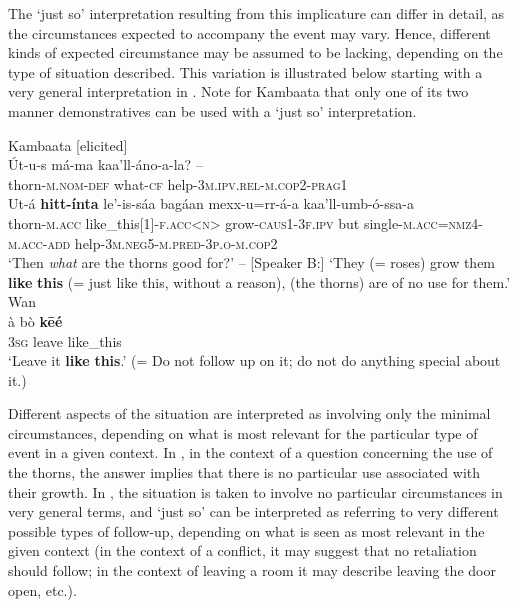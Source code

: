 \documentclass[output=paper,colorlinks,citecolor=brown]{langscibook}
\begin{document}
The ‘just so’ interpretation resulting from this implicature can differ in detail, as the circumstances expected to accompany the event may vary. Hence, different kinds of expected circumstance may be assumed to be lacking, depending on the type of situation described. This variation is illustrated below starting with a very general interpretation in . Note for Kambaata that only one of its two manner demonstratives can be used with a ‘just so’ interpretation.


\ea\label{ex:nikitina:6}
\ea\label{ex:nikitina:6a} {Kambaata [elicited]}\\
\gll Út-u-s má-ma kaa’ll-áno-a-la? – \\
     thorn-\textsc{m.nom-def} what-\textsc{cf} help-\textsc{3m.ipv.rel}{}-\textsc{m.cop2}{}-\textsc{prag1}\\
\gll Ut-á \textbf{hitt-ínta} le’-is-sáa bagáan mexx-u=rr-á-a kaa’ll-umb-ó-ssa-a\\
     thorn-\textsc{m.acc} like\_this[1]\textsc{{}-f.acc<n>} grow-\textsc{caus1}{}-\textsc{3f.ipv} but single-\textsc{m.acc}=\textsc{nmz4}{}-\textsc{m.acc}{}-\textsc{add} help-3\textsc{m.neg5}{}-\textsc{m.pred}{}-\textsc{3p.o}{}-\textsc{m.cop2}\\
\glt [Speaker A:] ‘Then \textit{what} are the thorns good for?’ – [Speaker B:] ‘They (= roses) grow them \textbf{like} \textbf{this} (= just like this, without a reason), (the thorns) are of no use for them.’ 
\ex\label{ex:nikitina:6b} {Wan}\\
\gll à bò \textbf{kēé}\\
     \textsc{3sg} leave like\_this\\
\glt ‘Leave it \textbf{like} \textbf{this}.’ (= Do not follow up on it; do not do anything special about it.)
\z
\z

Different aspects of the situation are interpreted as involving only the minimal circumstances, depending on what is most relevant for the particular type of event in a given context. In , in the context of a question concerning the use of the thorns, the answer implies that there is no particular use associated with their growth. In , the situation is taken to involve no particular circumstances in very general terms, and ‘just so’ can be interpreted as referring to very different possible types of follow-up, depending on what is seen as most relevant in the given context (in the context of a conflict, it may suggest that no retaliation should follow; in the context of leaving a room it may describe leaving the door open, etc.).
\end{document}
